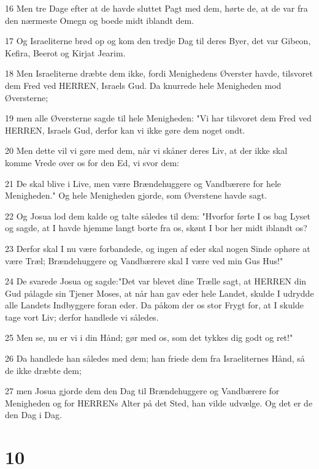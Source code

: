 \par 16 Men tre Dage efter at de havde sluttet Pagt med dem, hørte de, at de var fra den nærmeste Omegn og boede midt iblandt dem.
\par 17 Og Israeliterne brød op og kom den tredje Dag til deres Byer, det var Gibeon, Kefira, Beerot og Kirjat Jearim.
\par 18 Men Israeliterne dræbte dem ikke, fordi Menighedens Øverster havde, tilsvoret dem Fred ved HERREN, Israels Gud. Da knurrede hele Menigheden mod Øversterne;
\par 19 men alle Øversterne sagde til hele Menigheden: "Vi har tilsvoret dem Fred ved HERREN, Israels Gud, derfor kan vi ikke gøre dem noget ondt.
\par 20 Men dette vil vi gøre med dem, når vi skåner deres Liv, at der ikke skal komme Vrede over os for den Ed, vi svor dem:
\par 21 De skal blive i Live, men være Brændehuggere og Vandbærere for hele Menigheden." Og hele Menigheden gjorde, som Øverstene havde sagt.
\par 22 Og Josua lod dem kalde og talte således til dem: "Hvorfor førte I os bag Lyset og sagde, at I havde hjemme langt borte fra os, skønt I bor her midt iblandt os?
\par 23 Derfor skal I nu være forbandede, og ingen af eder skal nogen Sinde ophøre at være Træl; Brændehuggere og Vandbærere skal I være ved min Gus Hus!"
\par 24 De svarede Josua og sagde:"Det var blevet dine Trælle sagt, at HERREN din Gud pålagde sin Tjener Moses, at når han gav eder hele Landet, skulde I udrydde alle Landets Indbyggere foran eder. Da påkom der os stor Frygt for, at I skulde tage vort Liv; derfor handlede vi således.
\par 25 Men se, nu er vi i din Hånd; gør med os, som det tykkes dig godt og ret!"
\par 26 Da handlede han således med dem; han friede dem fra Israeliternes Hånd, så de ikke dræbte dem;
\par 27 men Josua gjorde dem den Dag til Brændehuggere og Vandbærere for Menigheden og for HERRENs Alter på det Sted, han vilde udvælge. Og det er de den Dag i Dag.

\chapter{10}

